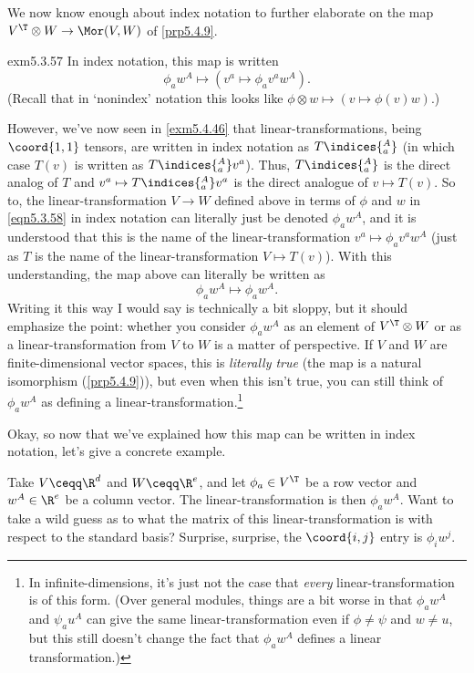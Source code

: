 We now know enough about index notation to further elaborate on the map $V^{\T}\otimes W\rightarrow \Mor (V,W)$ of \cref{prp5.4.9}.
\begin{exm}{}{exm5.3.57}
	In index notation, this map is written
	\begin{equation}\label{eqn5.3.58}
		\phi _aw^A\mapsto (v^a\mapsto \phi _av^aw^A).
	\end{equation}
	(Recall that in `nonindex' notation this looks like $\phi \otimes w\mapsto (v\mapsto \phi (v)w)$.)
	
	However, we've now seen in \cref{exm5.4.46} that linear-transformations, being $\coord{1,1}$ tensors, are written in index notation as $T\indices{^A_a}$ (in which case $T(v)$ is written as $T\indices{^A_a}v^a$).  Thus, $T\indices{^A_a}$ is the direct analog of $T$ and $v^a\mapsto T\indices{^A_a}v^a$ is the direct analogue of $v\mapsto T(v)$.  So to, the linear-transformation $V\rightarrow W$ defined above in terms of $\phi$ and $w$ in \eqref{eqn5.3.58} in index notation can literally just be denoted $\phi _aw^A$, and it is understood that this is the name of the linear-transformation $v^a\mapsto \phi _av^aw^A$ (just as $T$ is the name of the linear-transformation $V\mapsto T(v)$).  With this understanding, the map above can literally be written as
	\begin{equation}
		\phi _aw^A\mapsto \phi _aw^A.
	\end{equation}
	Writing it this way I would say is technically a bit sloppy, but it should emphasize the point:  whether you consider $\phi _aw^A$ as an element of $V^{\T}\otimes W$ or as a linear-transformation from $V$ to $W$ is a matter of perspective.  If $V$ and $W$ are finite-dimensional vector spaces, this is \emph{literally true} (the map is a natural isomorphism (\cref{prp5.4.9})), but even when this isn't true, you can still think of $\phi _aw^A$ as defining a linear-transformation.\footnote{In infinite-dimensions, it's just not the case that \emph{every} linear-transformation is of this form.  (Over general modules, things are a bit worse in that $\phi _aw^A$ and $\psi _au^A$ can give the same linear-transformation even if $\phi \neq \psi$ and $w\neq u$, but this still doesn't change the fact that $\phi _aw^A$ defines a linear transformation.)}
	
	Okay, so now that we've explained how this map can be written in index notation, let's give a concrete example.
	
	Take $V\ceqq \R ^d$ and $W\ceqq \R ^e$, and let $\phi _a\in V^{\T}$ be a row vector and $w^A\in \R ^e$ be a column vector.  The linear-transformation is then $\phi _aw^A$.  Want to take a wild guess as to what the matrix of this linear-transformation is with respect to the standard basis?  Surprise, surprise, the $\coord{i,j}$ entry is $\phi _iw^j$.
	

\end{exm}
